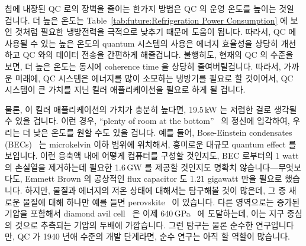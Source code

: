 칩에 내장된 QC 로의 장벽을 줄이는 한가지 방법은 QC 의 운영 온도를 높이는 것일
겁니다.
더 높은 온도는
Table~\ref{tab:future:Refrigeration Power Consumption} 에 보인 것처럼
필요한 냉방전력을 극적으로 낮추기 때문에 도움이 됩니다.
따라서, QC 에 사용될 수 있는 높은 온도의 quantum 시스템의 사용은 에너지
효율성을 상당히 개선하고 QC 와의 데이터 전송을 간편하게 해줄겁니다.
불행히도, 현재의 QC 의 수준을 보면, 더 높은 온도는 동시에 coherence time 을
상당히 줄여버릴겁니다.
따라서, 가까운 미래에, QC 시스템은 에너지를 많이 소모하는 냉방기를 필요로 할
것이어서, QC 시스템이 큰 가치를 지닌 킬러 애플리케이션을 필요로 하게 될 겁니다.

물론, 이 킬러 애플리케이션의 가치가 충분히 높다면, 19.5\,kW 는 저렴한 걸로
생각될 수 있을 겁니다.
이런 경우,
``plenty of room at the bottom''~\cite{RichardPFeynman1959RoomAtBottom} 의
정신에 입각하여, 우리는 더 낮은 온도를 원할 수도 있을 겁니다.
예를 들어, Bose-Einstein condensates
(BECs)~\cite{NIST2001BoseEinsteinCondensate} 는 microkelvin 이하 범위에
위치해서, 흥미로운 대규모 quantum effect 를 보입니다.
이런 응축액 내에 어떻게 컴퓨터를 구성할 것인지도, BEC 로부터의 1 watt 의
손실열을 제거하는데 필요한 1.6\,GW 를 제공할 것인지도 명확치
않습니다---무엇보다도, Emmett Brown 의 공상적인 flux capacitor 도 1.21 gigawatt
만을 필요로 했습니다.
하지만, 물질과 에너지의 저온 상태에 대해서는 탐구해볼 것이 많은데, 그 중 새로운
물질에 대해 하나만 예를 들면
perovskite~\cite{ZhengChen2016PerovskiteQDMOFthinFilm} 이 있습니다.
다른 영역으로는 증가된 기압을 포함해서 diamond avil
cell~\cite{Weir1959DiamondAnvilCell} 은 이제
640\,GPa~\cite{LeonidDubrovinsky2012640GPaDiamondAnvilCell} 에 도달하는데, 이는
지구 중심의 것으로 추측되는 기압의 두배에 가깝습니다.
그런 탐구는 물론 순수한 연구입니다만, QC 가 1940 년애 수준의 개발 단계라면,
순수 연구는 아직 할 역할이 많습니다.

